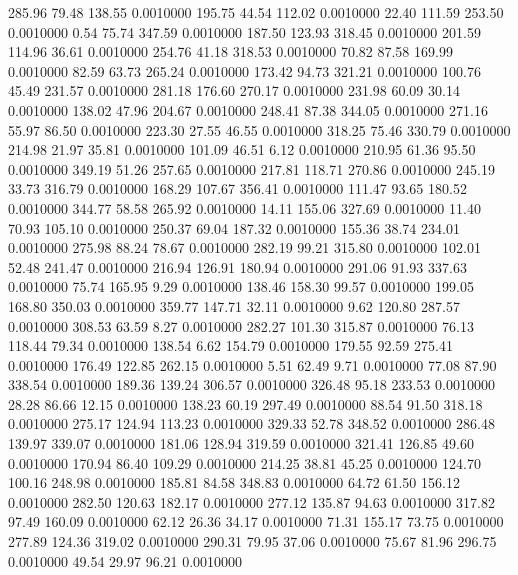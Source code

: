  285.96   79.48  138.55   0.0010000
 195.75   44.54  112.02   0.0010000
  22.40  111.59  253.50   0.0010000
   0.54   75.74  347.59   0.0010000
 187.50  123.93  318.45   0.0010000
 201.59  114.96   36.61   0.0010000
 254.76   41.18  318.53   0.0010000
  70.82   87.58  169.99   0.0010000
  82.59   63.73  265.24   0.0010000
 173.42   94.73  321.21   0.0010000
 100.76   45.49  231.57   0.0010000
 281.18  176.60  270.17   0.0010000
 231.98   60.09   30.14   0.0010000
 138.02   47.96  204.67   0.0010000
 248.41   87.38  344.05   0.0010000
 271.16   55.97   86.50   0.0010000
 223.30   27.55   46.55   0.0010000
 318.25   75.46  330.79   0.0010000
 214.98   21.97   35.81   0.0010000
 101.09   46.51    6.12   0.0010000
 210.95   61.36   95.50   0.0010000
 349.19   51.26  257.65   0.0010000
 217.81  118.71  270.86   0.0010000
 245.19   33.73  316.79   0.0010000
 168.29  107.67  356.41   0.0010000
 111.47   93.65  180.52   0.0010000
 344.77   58.58  265.92   0.0010000
  14.11  155.06  327.69   0.0010000
  11.40   70.93  105.10   0.0010000
 250.37   69.04  187.32   0.0010000
 155.36   38.74  234.01   0.0010000
 275.98   88.24   78.67   0.0010000
 282.19   99.21  315.80   0.0010000
 102.01   52.48  241.47   0.0010000
 216.94  126.91  180.94   0.0010000
 291.06   91.93  337.63   0.0010000
  75.74  165.95    9.29   0.0010000
 138.46  158.30   99.57   0.0010000
 199.05  168.80  350.03   0.0010000
 359.77  147.71   32.11   0.0010000
   9.62  120.80  287.57   0.0010000
 308.53   63.59    8.27   0.0010000
 282.27  101.30  315.87   0.0010000
  76.13  118.44   79.34   0.0010000
 138.54    6.62  154.79   0.0010000
 179.55   92.59  275.41   0.0010000
 176.49  122.85  262.15   0.0010000
   5.51   62.49    9.71   0.0010000
  77.08   87.90  338.54   0.0010000
 189.36  139.24  306.57   0.0010000
 326.48   95.18  233.53   0.0010000
  28.28   86.66   12.15   0.0010000
 138.23   60.19  297.49   0.0010000
  88.54   91.50  318.18   0.0010000
 275.17  124.94  113.23   0.0010000
 329.33   52.78  348.52   0.0010000
 286.48  139.97  339.07   0.0010000
 181.06  128.94  319.59   0.0010000
 321.41  126.85   49.60   0.0010000
 170.94   86.40  109.29   0.0010000
 214.25   38.81   45.25   0.0010000
 124.70  100.16  248.98   0.0010000
 185.81   84.58  348.83   0.0010000
  64.72   61.50  156.12   0.0010000
 282.50  120.63  182.17   0.0010000
 277.12  135.87   94.63   0.0010000
 317.82   97.49  160.09   0.0010000
  62.12   26.36   34.17   0.0010000
  71.31  155.17   73.75   0.0010000
 277.89  124.36  319.02   0.0010000
 290.31   79.95   37.06   0.0010000
  75.67   81.96  296.75   0.0010000
  49.54   29.97   96.21   0.0010000
